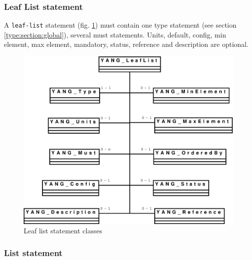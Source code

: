 \documentclass[a4paper]{article}
\begin{document}
\subsubsection{Leaf List statement}

A {\tt  leaf-list} statement  (fig.  \ref{leaflist}) must  contain one
type statement  (see section \ref{type:section:global}),  several must
statements.   Units,  default,   config,  min  element,  max  element,
mandatory, status, reference and description are optional.
\begin{figure}[htbp]
\begin{center}
\includegraphics[scale = .3]{leaflist.eps}
\end{center}
\caption{Leaf list statement classes}
\label{leaflist}
\end{figure}

\subsubsection{List statement}
\end{document}
